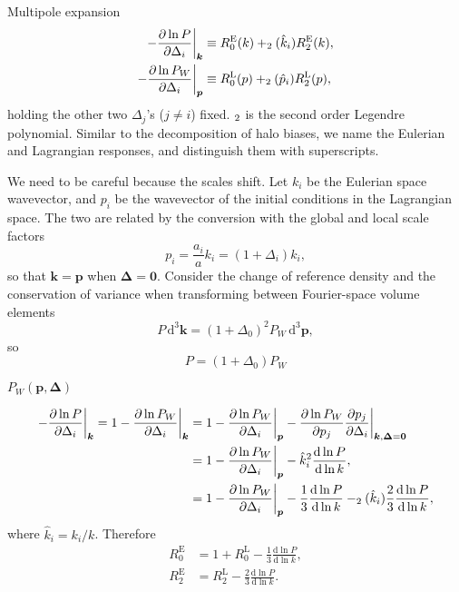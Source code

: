 \documentclass[a4paper,11pt]{article}
\let\L\relax
\DeclareMathOperator{\L}{\mathcal{L}}
\renewcommand{\d}{\mathrm{d}}
\newcommand{\vk}{{\bm k}}
\newcommand{\vp}{{\bm p}}
\newcommand{\vDelta}{{\bm\Delta}}
\newcommand{\Euler}{\mathrm{E}}
\newcommand{\Lagrange}{\mathrm{L}}
\begin{document}
Multipole expansion
\begin{align}
    - \frac{\partial\ln P}{\partial\Delta_i} \bigg|_\vk
    &\equiv R^\Euler_0(k) + \L_2(\hat k_i) R^\Euler_2(k), \nonumber\\
    - \frac{\partial\ln P_W}{\partial\Delta_i} \bigg|_\vp
    &\equiv R^\Lagrange_0(p) + \L_2(\hat p_i) R^\Lagrange_2(p),
\end{align}
holding the other two $\Delta_j$'s ($j \neq i$) fixed.
$\L_2$ is the second order Legendre polynomial.
Similar to the decomposition of halo biases, we name the Eulerian and
Lagrangian responses, and distinguish them with superscripts.

We need to be careful because the scales shift.
Let $k_i$ be the Eulerian space wavevector, and $p_i$ be the wavevector of the
initial conditions in the Lagrangian space.
The two are related by the conversion with the global and local scale factors
\begin{equation}
    p_i = \frac{a_i}a k_i = (1 + \Delta_i) k_i,
\end{equation}
so that $\vk = \vp$ when $\vDelta = \bm0$.
Consider the change of reference density and the conservation of variance when
transforming between Fourier-space volume elements
\begin{equation}
    P \,\d^3\vk = (1 + \Delta_0)^2 P_W \,\d^3\vp,
\end{equation}
so
\begin{equation}
    P = (1 + \Delta_0) P_W
\end{equation}

$P_W(\vp, \vDelta)$

\begin{align}
    - \frac{\partial\ln P}{\partial\Delta_i} \bigg|_\vk
    = 1 - \frac{\partial\ln P_W}{\partial\Delta_i} \bigg|_\vk
    &= 1 - \frac{\partial\ln P_W}{\partial\Delta_i} \bigg|_\vp
    - \frac{\partial\ln P_W}{\partial p_j}
        \frac{\partial p_j}{\partial \Delta_i} \bigg|_{\vk, \vDelta=\bm0}
    \nonumber\\
    &= 1 - \frac{\partial\ln P_W}{\partial\Delta_i} \bigg|_\vp
    - \hat k_i^2 \frac{\d\ln P}{\d\ln k}, \nonumber\\
    &= 1 - \frac{\partial\ln P_W}{\partial\Delta_i} \bigg|_\vp
    - \frac13 \frac{\d\ln P}{\d\ln k}
    - \L_2(\hat k_i) \frac23 \frac{\d\ln P}{\d\ln k},
\end{align}
where $\hat k_i = k_i / k$.
Therefore
\begin{align}
    R^\Euler_0 &= 1 + R^\Lagrange_0 - \frac13 \frac{\d\ln P}{\d\ln k},
    \nonumber\\
    R^\Euler_2 &= R^\Lagrange_2 - \frac23 \frac{\d\ln P}{\d\ln k}.
\end{align}
\end{document}

